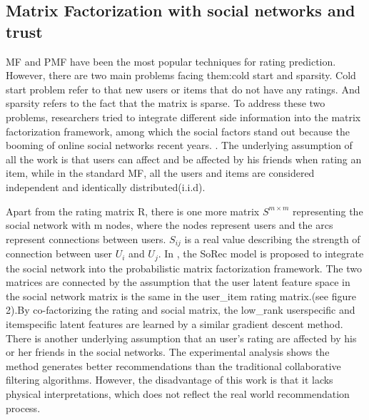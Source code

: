 \subsection{Matrix Factorization with social networks and trust}
MF and PMF have been the most popular techniques for rating prediction. However, there are two main problems facing them:cold start and sparsity. Cold start problem refer to that new users or items that do not have any ratings. And sparsity refers to the fact that the matrix is sparse. To address these two problems, researchers tried to integrate different side information into the matrix factorization framework, among which the social factors stand out because the booming of online social networks recent years. \cite{jamali2010matrix}\cite{ma2009llearningEnsembel}\cite{ma2009learningTrust}\cite{ma2008sorec}\cite{ma2011recommender}\cite{massa2004trust}\cite{yang2013social}. The underlying assumption of all the work is that users can affect and be affected by his friends when rating an item, while in the standard MF, all the users and items are considered independent and identically distributed(i.i.d).

Apart from the rating matrix R, there is one more matrix $S^{m \times m}$ representing the social network with m nodes, where the nodes represent users and the arcs represent connections between users. $S_{ij}$ is a real value describing the strength of connection between user $U_i$ and $U_j$. In \cite{ma2008sorec}, the SoRec model is proposed to integrate the social network into the probabilistic matrix factorization framework. The two matrices are connected by the assumption that the user latent feature space in the social network matrix is the same in the user\_item rating matrix.(see figure 2).By co-factorizing the rating and social matrix, the low\_rank user\-specific and item\-specific latent features are learned by a similar gradient descent method. There is another underlying assumption that an user's rating are affected by his or her friends in the social networks. The experimental analysis shows the method generates better recommendations than the traditional collaborative filtering algorithms. However, the disadvantage of this work is that it lacks physical interpretations, which does not reflect the real world recommendation process.

